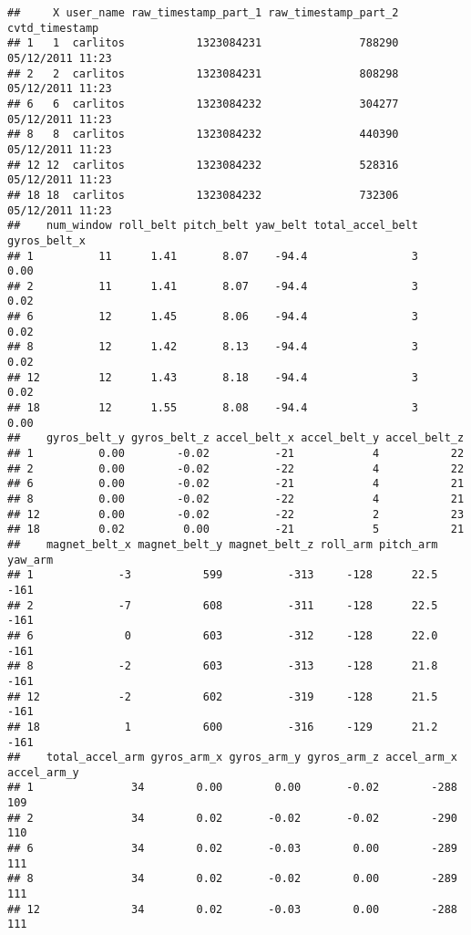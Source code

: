 \documentclass[]{article}
\begin{document}
\begin{verbatim}
##     X user_name raw_timestamp_part_1 raw_timestamp_part_2   cvtd_timestamp
## 1   1  carlitos           1323084231               788290 05/12/2011 11:23
## 2   2  carlitos           1323084231               808298 05/12/2011 11:23
## 6   6  carlitos           1323084232               304277 05/12/2011 11:23
## 8   8  carlitos           1323084232               440390 05/12/2011 11:23
## 12 12  carlitos           1323084232               528316 05/12/2011 11:23
## 18 18  carlitos           1323084232               732306 05/12/2011 11:23
##    num_window roll_belt pitch_belt yaw_belt total_accel_belt gyros_belt_x
## 1          11      1.41       8.07    -94.4                3         0.00
## 2          11      1.41       8.07    -94.4                3         0.02
## 6          12      1.45       8.06    -94.4                3         0.02
## 8          12      1.42       8.13    -94.4                3         0.02
## 12         12      1.43       8.18    -94.4                3         0.02
## 18         12      1.55       8.08    -94.4                3         0.00
##    gyros_belt_y gyros_belt_z accel_belt_x accel_belt_y accel_belt_z
## 1          0.00        -0.02          -21            4           22
## 2          0.00        -0.02          -22            4           22
## 6          0.00        -0.02          -21            4           21
## 8          0.00        -0.02          -22            4           21
## 12         0.00        -0.02          -22            2           23
## 18         0.02         0.00          -21            5           21
##    magnet_belt_x magnet_belt_y magnet_belt_z roll_arm pitch_arm yaw_arm
## 1             -3           599          -313     -128      22.5    -161
## 2             -7           608          -311     -128      22.5    -161
## 6              0           603          -312     -128      22.0    -161
## 8             -2           603          -313     -128      21.8    -161
## 12            -2           602          -319     -128      21.5    -161
## 18             1           600          -316     -129      21.2    -161
##    total_accel_arm gyros_arm_x gyros_arm_y gyros_arm_z accel_arm_x accel_arm_y
## 1               34        0.00        0.00       -0.02        -288         109
## 2               34        0.02       -0.02       -0.02        -290         110
## 6               34        0.02       -0.03        0.00        -289         111
## 8               34        0.02       -0.02        0.00        -289         111
## 12              34        0.02       -0.03        0.00        -288         111

\end{verbatim}
\end{document}
